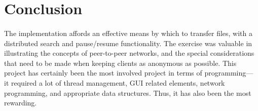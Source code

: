 \documentclass[10pt,a4paper]{article}
\begin{document}
\section{Conclusion}
\paragraph{} 
The implementation affords an effective means by which to transfer files, with a distributed search and pause/resume functionality. The exercise was valuable in illustrating the concepts of peer-to-peer networks, and the special considerations that need to be made when keeping clients as anonymous as possible. This project has certainly been the most involved project in terms of programming--- it required a lot of thread management, GUI related elements, network programming, and appropriate data structures. Thus, it has also been the most rewarding.
\end{document}
